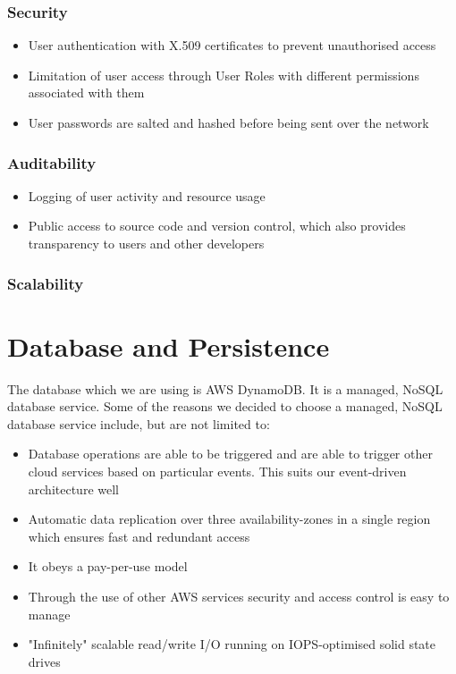 \documentclass{article}
\begin{document}
\subsubsection{Security}
\begin{itemize}
	\item User authentication with X.509 certificates to prevent unauthorised access
	\item Limitation of user access through User Roles with different permissions associated with them
	\item User passwords are salted and hashed before being sent over the network 
\end{itemize}

\subsubsection{Auditability}
\begin{itemize}
	\item Logging of user activity and resource usage
	\item Public access to source code and version control, which also provides transparency to users and other developers
\end{itemize}

\subsubsection{Scalability}

\section{Database and Persistence}
	The database which we are using is AWS DynamoDB. It is a managed, NoSQL database service. Some of the reasons we decided to choose a managed, NoSQL database service include, but are not limited to:
	\begin{itemize}
		\item Database operations are able to be triggered and are able to trigger other cloud services based on particular events. This suits our event-driven architecture well
		\item Automatic data replication over three availability-zones in a single region which ensures fast and redundant access
		\item It obeys a pay-per-use model
		\item Through the use of other AWS services security and access control is easy to manage
		\item "Infinitely" scalable read/write I/O running on IOPS-optimised solid state drives
	\end{itemize}
\end{document}

